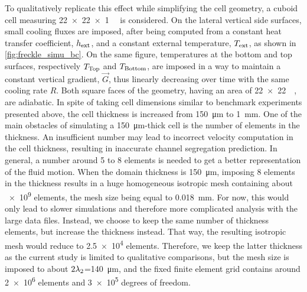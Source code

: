 To qualitatively replicate this effect while simplifying the cell geometry, a cuboid cell measuring \SI{22 x 22 x 1}{\milli \uvolume}  
is considered. On the lateral vertical side surfaces, small cooling fluxes are imposed, after being computed from a constant heat transfer 
coefficient, $h_{\text{ext}}$, and a constant external temperature, $T_{\text{ext}}$, as shown in \cref{fig:freckle_simu_bc}. On the same figure, 
temperatures at the bottom and top surfaces, respectively $T_{\text{Top}}$  and $T_{\text{Bottom}}$, are imposed in a way to maintain a 
constant vertical gradient, $\vec{G}$, thus linearly 
decreasing over time with the same cooling rate $R$. Both square faces of the geometry, having an area of \SI{22 x 22}{\milli \uarea}, 
are adiabatic. In spite of taking cell dimensions similar to benchmark experiments presented above, the cell thickness 
is increased from \SI{150}{\micro \metre} to \SI{1}{\milli \metre}. One of the main obstacles of simulating a \SI{150}{\micro \metre}-thick
cell is the number of elements in the thickness. An insufficient number may lead to incorrect velocity computation in the cell thickness,
resulting in inaccurate channel segregation prediction. In general, a number around 5 to 8 elements is needed to get a better representation of the fluid motion.
When the domain thickness is \SI{150}{\micro \metre}, imposing 8 elements in the thickness results in a huge homogeneous isotropic mesh containing
about \num{e9} elements, the mesh size being equal to \SI{0.018}{\milli \metre}. %
For now, this would only lead to slower simulations 
and therefore more complicated analysis with the large data files. Instead, we choose to keep the same number of thickness elements,
but increase the thickness instead. That way, the resulting isotropic mesh would reduce to \num{2.5e4} elements. Therefore, we keep the latter
thickness as the current study is limited to qualitative comparisons, but the mesh size is imposed to about $2{\lambda}_{2}$=\SI{140}{\micro \metre}, and 
the fixed finite element grid contains around \num{2e6} elements and \num{3e5} degrees of freedom. 


